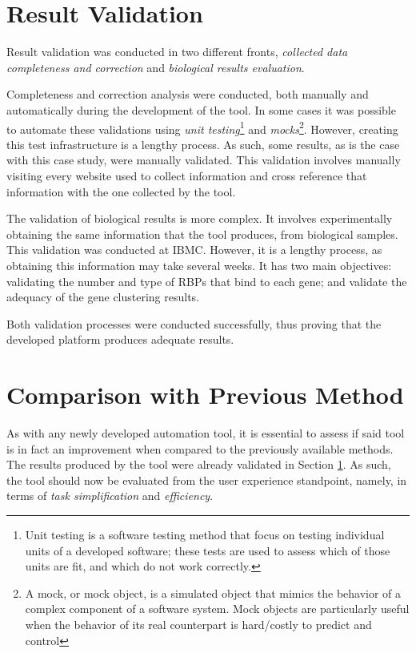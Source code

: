 \section{Result Validation}\label{sec:caseval}

Result validation was conducted in two different fronts, \emph{collected data
completeness and correction} and \emph{biological results evaluation}.

Completeness and correction analysis were conducted, both manually and
automatically during the development of the tool. In some cases it was possible
to automate these validations using \emph{unit testing}\footnote{Unit testing is
a software testing method that focus on testing individual units of a developed
software; these tests are used to assess which of those units are fit, and which
do not work correctly.} and \emph{mocks}\footnote{A mock, or mock object, is a
simulated object that mimics the behavior of a complex component of a software
system. Mock objects are particularly useful when the behavior of its real
counterpart is hard/costly to predict and control}. However, creating this test
infrastructure is a lengthy process. As such, some results, as is the case with
this case study, were manually validated. This validation involves manually
visiting every website used to collect information and cross reference that
information with the one collected by the tool.

The validation of biological results is more complex. It involves experimentally
obtaining the same information that the tool produces, from biological samples.
This validation was conducted at IBMC. However, it is a lengthy process, as
obtaining this information may take several weeks. It has two main objectives:
validating the number and type of RBPs that bind to each gene; and validate the
adequacy of the gene clustering results.

Both validation processes were conducted successfully, thus proving that the
developed platform produces adequate results.

\section{Comparison with Previous Method}\label{sec:caseperf}

As with any newly developed automation tool, it is essential to assess if said
tool is in fact an improvement when compared to the previously available
methods. The results produced by the tool were already validated in Section
\ref{sec:caseval}. As such, the tool should now be evaluated from the user
experience standpoint, namely, in terms of \emph{task simplification} and
\emph{efficiency}.

